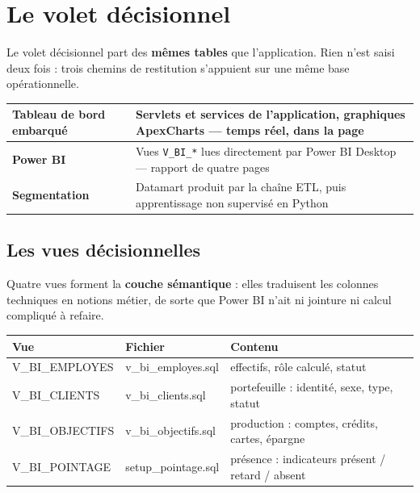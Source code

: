 \section{Le volet décisionnel}

Le volet décisionnel part des \textbf{mêmes tables} que l'application. Rien
n'est saisi deux fois : trois chemins de restitution s'appuient sur une même
base opérationnelle.

\begin{center}
\small
\begin{tabularx}{\textwidth}{|>{\bfseries}L{3.6cm}|X|}
\hline
Tableau de bord embarqué & Servlets et services de l'application, graphiques ApexCharts --- temps réel, dans la page\\
\hline
Power BI & Vues \texttt{V\_BI\_*} lues directement par Power BI Desktop --- rapport de quatre pages\\
\hline
Segmentation & Datamart produit par la chaîne ETL, puis apprentissage non supervisé en Python\\
\hline
\end{tabularx}
\end{center}

\subsection{Les vues décisionnelles}

Quatre vues forment la \textbf{couche sémantique} : elles traduisent les
colonnes techniques en notions métier, de sorte que Power BI n'ait ni jointure
ni calcul compliqué à refaire.

\noindent\begin{tabularx}{\textwidth}{|>{\ttfamily}L{3.5cm}|L{3.2cm}|X|}
\hline
\textmd{\textbf{Vue}} & \textbf{Fichier} & \textbf{Contenu}\\
\hline
V\_BI\_EMPLOYES & v\_bi\_employes.sql & effectifs, rôle calculé, statut\\
\hline
V\_BI\_CLIENTS & v\_bi\_clients.sql & portefeuille : identité, sexe, type, statut\\
\hline
V\_BI\_OBJECTIFS & v\_bi\_objectifs.sql & production : comptes, crédits, cartes, épargne\\
\hline
V\_BI\_POINTAGE & setup\_pointage.sql & présence : indicateurs présent / retard / absent\\
\hline
\end{tabularx}

